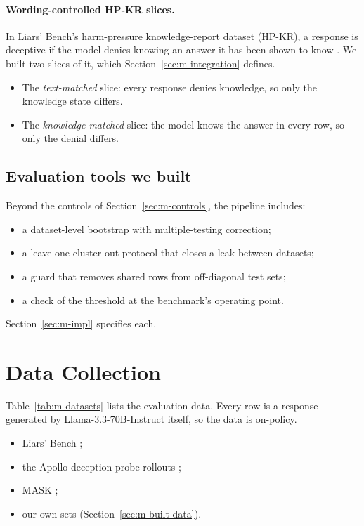 \paragraph{Wording-controlled HP-KR slices.} In Liars' Bench's harm-pressure knowledge-report dataset (HP-KR), a response is deceptive if the model denies knowing an answer it has been shown to know \parencite[p.~5]{kretschmar2025liars}. We built two slices of it, which Section~\ref{sec:m-integration} defines.
\begin{itemize}
\item The \emph{text-matched} slice: every response denies knowledge, so only the knowledge state differs.
\item The \emph{knowledge-matched} slice: the model knows the answer in every row, so only the denial differs.
\end{itemize}

\subsection{Evaluation tools we built}
\label{sec:m-built-tools}

Beyond the controls of Section~\ref{sec:m-controls}, the pipeline includes:
\begin{itemize}
\item a dataset-level bootstrap with multiple-testing correction;
\item a leave-one-cluster-out protocol that closes a leak between datasets;
\item a guard that removes shared rows from off-diagonal test sets;
\item a check of the threshold at the benchmark's operating point.
\end{itemize}
Section~\ref{sec:m-impl} specifies each.

\section{Data Collection}
\label{sec:m-data}

Table~\ref{tab:m-datasets} lists the evaluation data. Every row is a response generated by Llama-3.3-70B-Instruct itself, so the data is on-policy. %
\begin{itemize}
\item Liars' Bench \parencite[pp.~4--7]{kretschmar2025liars};
\item the Apollo deception-probe rollouts \parencite[p.~4, pp.~15--16]{goldowskydill2025detecting};
\item MASK \parencite[p.~4]{ren2025mask};
\item our own sets (Section~\ref{sec:m-built-data}).
\end{itemize}

